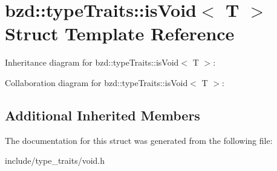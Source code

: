 \hypertarget{structbzd_1_1typeTraits_1_1isVoid}{}\section{bzd\+:\+:type\+Traits\+:\+:is\+Void$<$ T $>$ Struct Template Reference}
\label{structbzd_1_1typeTraits_1_1isVoid}


Inheritance diagram for bzd\+:\+:type\+Traits\+:\+:is\+Void$<$ T $>$\+:


Collaboration diagram for bzd\+:\+:type\+Traits\+:\+:is\+Void$<$ T $>$\+:
\subsection*{Additional Inherited Members}


The documentation for this struct was generated from the following file\+:\begin{DoxyCompactItemize}
\item 
include/type\+\_\+traits/void.\+h\end{DoxyCompactItemize}
